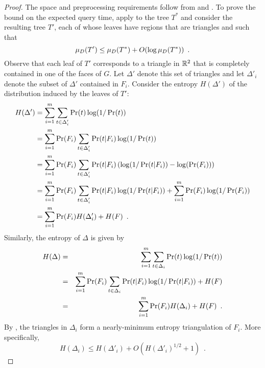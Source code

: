 \documentclass[lotsofwhite]{patmorin}
\begin{document}
\begin{proof}
The space and preprocessing requirements follow from
 and .
To prove the bound on the expected query time, apply
 to the tree $T^*$ and consider the resulting tree
$T'$, each of whose leaves have regions that are triangles and such
that
\begin{equation}
     \mu_D(T') \le \mu_D(T^*) + O(\log \mu_D(T^*)) \enspace .
       \eqlabelx{t-triangle}
\end{equation}
Observe that each leaf of $T'$ corresponds to a triangle in $\mathbb{R}^2$
that is completely contained in one of the faces of $G$.  Let
$\Delta'$ denote this set of triangles and let $\Delta'_i$ denote the
subset of $\Delta'$ contained in $F_i$.
Consider the entropy $H(\Delta')$ of the distribution induced by the
leaves of $T'$:
\begin{equation}\eqlabelx{h-delta-prime}
 \begin{split}
   H(\Delta') 
     & =  \sum_{i=1}^m \sum_{t\in \Delta'_i}\Pr(t)\log(1/\Pr(t)) \\
     & =  \sum_{i=1}^m \Pr(F_i)\sum_{t\in \Delta'_i}
            \Pr(t|F_i)\log(1/\Pr(t)) \\
     & =  \sum_{i=1}^m \Pr(F_i)\sum_{t\in \Delta'_i}
            \Pr(t|F_i)
            \left(
              \log(1/\Pr(t|F_i))-\log(\Pr(F_i))
            \right) \\
     & =  \sum_{i=1}^m \Pr(F_i)\sum_{t\in \Delta'_i}
            \Pr(t|F_i)\log(1/\Pr(t|F_i)) 
             + \sum_{i=1}^m \Pr(F_i) \log(1/\Pr(F_i)) \\
     & =  \sum_{i=1}^m \Pr(F_i) H(\Delta'_i) + H(F) \enspace .
 \end{split}
\end{equation}
Similarly, the entropy of $\Delta$ is given by 
\begin{eqnarray*}
   H(\Delta) 
     & = & \sum_{i=1}^m \sum_{t\in \Delta_i}\Pr(t)\log(1/\Pr(t)) \\
     & = & \sum_{i=1}^m \Pr(F_i)\sum_{t\in \Delta_i}
            \Pr(t|F_i)\log(1/\Pr(t|F_i)) 
          + H(F) \\
     & = & \sum_{i=1}^m \Pr(F_i) H(\Delta_i) + H(F) \enspace .
      \eqlabelx{h-delta}
\end{eqnarray*}
By , the triangles in $\Delta_i$ form a
nearly-minimum entropy triangulation of $F_i$.  More specifically, 
\begin{equation}
   H(\Delta_i) \le H(\Delta'_i) + O(H(\Delta'_i)^{1/2}+1)  \enspace .

\end{equation}
\end{proof}
\end{document}
